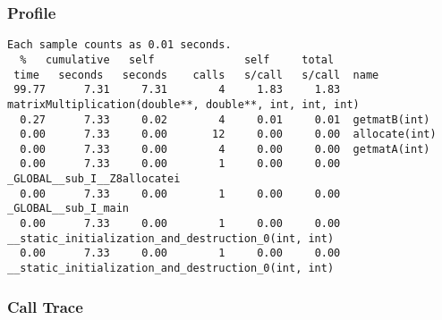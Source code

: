 \documentclass[7pt]{article}
\begin{document}
\subsubsection{Profile}

\begin{verbatim}
Each sample counts as 0.01 seconds.
  %   cumulative   self              self     total
 time   seconds   seconds    calls   s/call   s/call  name
 99.77      7.31     7.31        4     1.83     1.83  matrixMultiplication(double**, double**, int, int, int)
  0.27      7.33     0.02        4     0.01     0.01  getmatB(int)
  0.00      7.33     0.00       12     0.00     0.00  allocate(int)
  0.00      7.33     0.00        4     0.00     0.00  getmatA(int)
  0.00      7.33     0.00        1     0.00     0.00  _GLOBAL__sub_I__Z8allocatei
  0.00      7.33     0.00        1     0.00     0.00  _GLOBAL__sub_I_main
  0.00      7.33     0.00        1     0.00     0.00  __static_initialization_and_destruction_0(int, int)
  0.00      7.33     0.00        1     0.00     0.00  __static_initialization_and_destruction_0(int, int)

\end{verbatim}

\subsubsection{Call Trace}
\end{document}

